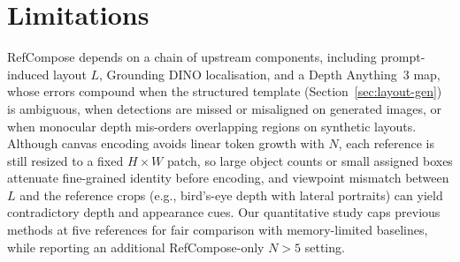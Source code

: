 \documentclass[runningheads]{llncs}
\begin{document}
\section{Limitations}

RefCompose depends on a chain of upstream components, including prompt-induced layout $L$, Grounding DINO localisation, and a Depth Anything~3 map, whose errors compound when the structured template (Section~\ref{sec:layout-gen}) is ambiguous, when detections are missed or misaligned on generated images, or when monocular depth mis-orders overlapping regions on synthetic layouts.
Although canvas encoding avoids linear token growth with $N$, each reference is still resized to a fixed $H \times W$ patch, so large object counts or small assigned boxes attenuate fine-grained identity before encoding, and viewpoint mismatch between $L$ and the reference crops (e.g., bird's-eye depth with lateral portraits) can yield contradictory depth and appearance cues.
Our quantitative study caps previous methods at five references for fair comparison with memory-limited baselines, while reporting an additional RefCompose-only $N{>}5$ setting.



\end{document}
